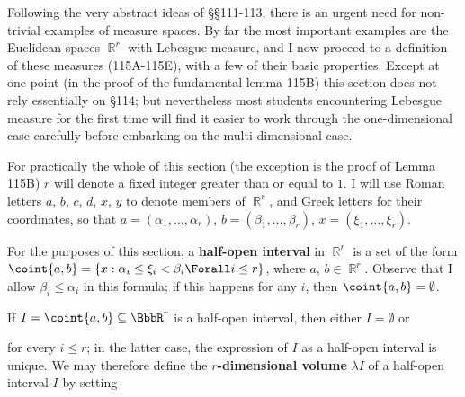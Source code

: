 
\def\chaptername{Measure spaces}
\def\sectionname{Lebesgue measure on $\BbbR^r$}


\def\headlinesectionname{Lebesgue measure on $\eightBbb R^r$}

Following the very abstract ideas of \S\S111-113, there is an urgent
need for non-trivial examples of measure spaces.   By far the most
important examples are the Euclidean spaces $\BbbR^r$ with Lebesgue
measure, and I now
proceed to a definition of these measures (115A-115E), with a few of
their basic properties.   Except at one point (in the proof of the
fundamental lemma 115B) this section does not rely essentially on \S114;
but nevertheless most students encountering Lebesgue measure for the
first time will find it easier to work through the one-dimensional case
carefully before embarking on the multi-dimensional case.

 For practically the whole of this section
(the exception is the proof of Lemma 115B) $r$ will denote a fixed
integer greater than or equal to $1$.    I will use Roman letters $a$,
$b$, $c$, $d$, $x$, $y$ to denote members of $\BbbR^r$, and Greek letters for their coordinates, so that $a=(\alpha_1,\ldots,\alpha_r)$,
$b=(\beta_1,\ldots,\beta_r)$, $x=(\xi_1,\ldots,\xi_r)$.

 For the purposes of this section, a {\bf
half-open interval} in $\BbbR^r$ is a set of the form
$\coint{a,b}=\{x:\alpha_i\le \xi_i<\beta_i\Forall i\le
r\}$, where $a$, $b\in\BbbR^r$.
Observe that I allow $\beta_i\le \alpha_i$ in this formula;  if this
happens for any $i$, then $\coint{a,b}=\emptyset$.



 If $I=\coint{a,b}\subseteq \BbbR^r$ is a
half-open interval, then either
$I=\emptyset$ or


\noindent for every $i\le r$;  in the latter case, the expression of $I$
as a half-open interval is unique.
We may therefore define the {\bf $r$-dimensional volume} $\lambda I$ of
a half-open interval $I$ by setting





